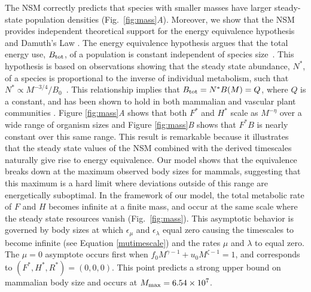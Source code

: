 \documentclass{pnastwo}
\begin{document}
\begin{article}
The NSM correctly predicts that species with smaller masses have larger steady-state population densities (Fig.~\ref{fig:mass}\emph{A}).
Moreover, we show that the NSM provides independent theoretical support for the energy equivalence hypothesis and Damuth's Law \cite{Damuth:1987kr,allen2002,enquist1998}.
The energy equivalence hypothesis argues that the total energy use, $B_{\rm tot}$, of a population is constant independent of species size~\cite{Damuth:1987kr,allen2002,enquist1998}. %
This hypothesis is based on observations showing that the steady state abundance, $N^*$, of a species is proportional to the inverse of individual metabolism, such that $N^*\propto M^{-3/4}/B_{0}$~\cite{allen2002,enquist1998}.
This relationship implies that $B_{\rm tot}=N^*B(M)=Q$, where $Q$ is a constant, and has been shown to hold in both mammalian and vascular plant communities \cite{Damuth:1987kr,allen2002,enquist1998}.
Figure \ref{fig:mass}\emph{A} shows that both $F^{*}$ and $H^{*}$ scale as $M^{-\eta}$ over a wide range of organism sizes and Figure \ref{fig:mass}\emph{B} shows that $F^{*}B$ is nearly constant over this same range.
This result is remarkable because it illustrates that the steady state values of the NSM combined with the derived timescales naturally give rise to energy equivalence.
Our model shows that the equivalence breaks down at the maximum observed body sizes for mammals, suggesting that this maximum is a hard limit where deviations outside of this range are energetically suboptimal. %
In the framework of our model, the total metabolic rate of $F$ and $H$ becomes infinite at a finite mass, and occur at the same scale where the steady state resources vanish (Fig.~\ref{fig:mass}). This asymptotic behavior is governed by body sizes at which $\epsilon_{\mu}$ and $\epsilon_{\lambda}$ equal zero causing the timescales to become infinite (see Equation \ref{mutimescale}) and the rates $\mu$ and $\lambda$ to equal zero.
The $\mu=0$ asymptote occurs first when $f_{0}M^{\gamma-1}+u_{0}M^{\zeta-1}=1$, and corresponds to $(F^*,H^*,R^*)=(0,0,0)$. This point predicts a strong upper bound on mammalian body size and occurs at $M_{\rm max}=6.54\times10^7$.

\end{article}
\end{document}
